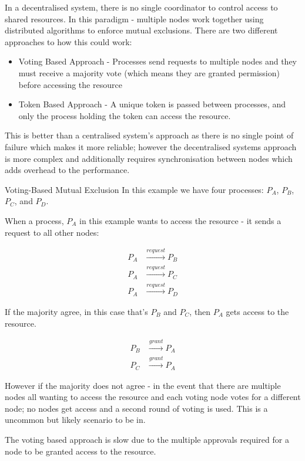 In a decentralised system, there is no single coordinator to control access to shared resources. In this paradigm - multiple nodes work together using distributed algorithms to enforce mutual exclusions. There are two different approaches to how this could work:
\begin{itemize}
    \item Voting Based Approach - Processes send requests to multiple nodes and they must receive a majority vote (which means they are granted permission) before accessing the resource
    \item Token Based Approach - A unique token is passed between processes, and only the process holding the token can access the resource.
\end{itemize}

This is better than a centralised system's approach as there is no single point of failure which makes it more reliable; however the decentralised systems approach is more complex and additionally requires synchronisation between nodes which adds overhead to the performance. 

\begin{example}{Voting-Based Mutual Exclusion}
In this example we have four processes: $P_A$, $P_B$, $P_C$, and $P_D$.

When a process, $P_A$ in this example wants to access the resource - it sends a request to all other nodes:

\begin{align*}
    P_A & \xrightarrow{request} P_B\\
    P_A & \xrightarrow{request} P_C\\
    P_A & \xrightarrow{request} P_D
\end{align*}

If the majority agree, in this case that's $P_B$ and $P_C$, then $P_A$ gets access to the resource.

\begin{align*}
    P_B & \xrightarrow{grant} P_A\\
    P_C & \xrightarrow{grant} P_A
\end{align*}

However if the majority does not agree - in the event that there are multiple nodes all wanting to access the resource and each voting node votes for a different node; no nodes get access and a second round of voting is used. This is a uncommon but likely scenario to be in. 

The voting based approach is slow due to the multiple approvals required for a node to be granted access to the resource.
\end{example}

